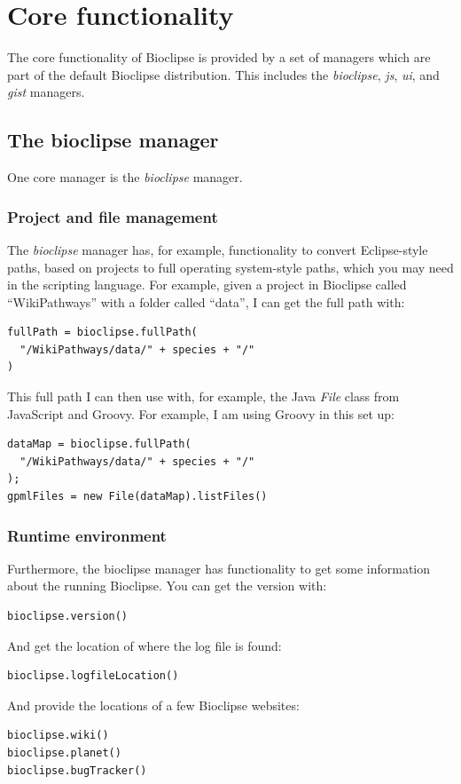 \documentclass[a5paper, 10pt]{memoir}
\begin{document}
\chapter{Core functionality}
\begin{refsection}

The core functionality of Bioclipse is provided by a set of managers which are part
of the default Bioclipse distribution. This includes the \textit{bioclipse},
\textit{js}, \textit{ui}, and \textit{gist} managers.

\section{The bioclipse manager}

One core manager is the \emph{bioclipse} manager. 

\subsection{Project and file management}
The \emph{bioclipse} manager has, for example,
functionality to convert Eclipse-style paths, based on projects to full
operating system-style paths, which you may need in the scripting language. For
example, given a project in Bioclipse called ``WikiPathways'' with a folder
called ``data'', I can get the full path with:
\begin{Verbatim}
fullPath = bioclipse.fullPath(
  "/WikiPathways/data/" + species + "/"
)
\end{Verbatim}
This full path I can then use with, for example, the Java
\emph{File} class from JavaScript and Groovy. For example,
I am using Groovy in this set up:
\begin{Verbatim}
dataMap = bioclipse.fullPath(
  "/WikiPathways/data/" + species + "/"
);
gpmlFiles = new File(dataMap).listFiles()
\end{Verbatim}

\subsection{Runtime environment}
Furthermore, the bioclipse manager has functionality to get some information
about the running Bioclipse. You can get the version with:
\begin{Verbatim}
bioclipse.version()
\end{Verbatim}
And get the location of where the log file is
found:
\begin{Verbatim}
bioclipse.logfileLocation()
\end{Verbatim}
And provide the locations of a few Bioclipse websites:
\begin{Verbatim}
bioclipse.wiki()
bioclipse.planet()
bioclipse.bugTracker()
\end{Verbatim}


\end{refsection}
\end{document}
